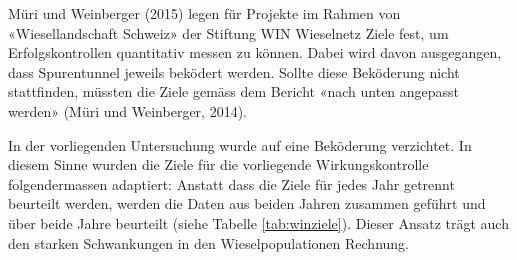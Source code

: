 \documentclass[
  oneside]{scrbook}
\begin{document}
Müri und Weinberger (2015) legen für Projekte im Rahmen von «Wiesellandschaft Schweiz» der Stiftung WIN Wieselnetz Ziele fest, um Erfolgskontrollen quantitativ messen zu können. Dabei wird davon ausgegangen, dass Spurentunnel jeweils beködert werden. Sollte diese Beköderung nicht stattfinden, müssten die Ziele gemäss dem Bericht «nach unten angepasst werden» (Müri und Weinberger, 2014).

In der vorliegenden Untersuchung wurde auf eine Beköderung verzichtet. In diesem Sinne wurden die Ziele für die vorliegende Wirkungskontrolle folgendermassen adaptiert: Anstatt dass die Ziele für jedes Jahr getrennt beurteilt werden, werden die Daten aus beiden Jahren zusammen geführt und über beide Jahre beurteilt (siehe Tabelle \ref{tab:winziele}). Dieser Ansatz trägt auch den starken Schwankungen in den Wieselpopulationen Rechnung.
\end{document}
